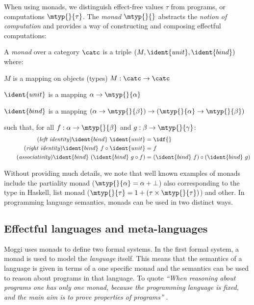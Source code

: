 When using monads, we distinguish effect-free values $\tau$ from programs, or
computations $\mtyp{}{\tau}$. The \emph{monad} $\mtyp{}{}$ abstracts the \emph{notion of
computation} and provides a way of constructing and composing effectful computations:

\begin{definition}
A \emph{monad} over a category $\catc$ is a triple $(M, \ident{unit}, \ident{bind})$ where:
\begin{compactitem}
\item $M$ is a mapping on objects (types) $M : \catc \rightarrow \catc$
\item $\ident{unit}$ is a mapping $\alpha \rightarrow \mtyp{}{\alpha}$
\item $\ident{bind}$ is a mapping $(\alpha \rightarrow \mtyp{}{\beta})
  \rightarrow (\mtyp{}{\alpha} \rightarrow \mtyp{}{\beta})$
\end{compactitem}
such that, for all $f:\alpha \rightarrow \mtyp{}{\beta}$ and $g:\beta \rightarrow \mtyp{}{\gamma}$:
\begin{align}
\tag{\emph{left identity}}
  \ident{bind}~\ident{unit} &= \idf{}
  \\
\tag{\emph{right identity}}
  \ident{bind}~f \circ \ident{unit} &= f
  \\
\tag{\emph{associativity}}
  \ident{bind}~(\ident{bind}~g \circ f) &= (\ident{bind}~f) \circ (\ident{bind}~g)
\end{align}
\end{definition}

\noindent
Without providing much details, we note that well known examples of monads include the partiality
monad ($\mtyp{}{\alpha} = \alpha + {\bot}$) also corresponding to the  type in
Haskell, list monad ($\mtyp{}{\tau} = 1 + (\tau \times \mtyp{}{\tau})$) and other.
In programming language semantics, monads can be used in two distinct ways.


\subsection{Effectful languages and meta-languages}
\label{sec:path-sem-langs}

Moggi uses monads to define two formal systems. In the first formal system, a monad is used to model
the \emph{language} itself. This means that the semantics of a language is given in terms of a
one specific monad and the semantics can be used to reason about programs in that language. To quote
\emph{``When reasoning about programs one has only one monad, because the programming language is
fixed, and the main aim is to prove properties of programs''} \cite[p. 5]{monad-notions}.

